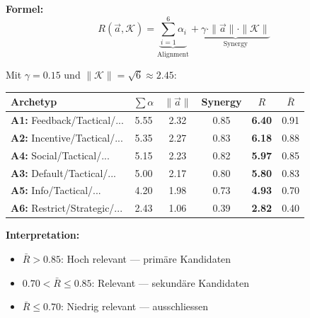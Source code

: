 \begin{tcolorbox}[colback=yellow!5!white, colframe=yellow!75!black,
    title=\textbf{Schritt 3: Relevanz $R(\vec{a}, \mathcal{K})$ berechnen}]

\textbf{Formel:}
\begin{equation*}
R(\vec{a}, \mathcal{K}) = \underbrace{\sum_{i=1}^{6} \alpha_i}_{\text{Alignment}} + \underbrace{\gamma \cdot \|\vec{a}\| \cdot \|\mathcal{K}\|}_{\text{Synergy}}
\end{equation*}

Mit $\gamma = 0.15$ und $\|\mathcal{K}\| = \sqrt{6} \approx 2.45$:

\medskip
\renewcommand{\arraystretch}{1.3}
\begin{tabular}{@{}lccccc@{}}
\toprule
\textbf{Archetyp} & $\sum\alpha$ & $\|\vec{a}\|$ & Synergy & $R$ & $\bar{R}$ \\
\midrule
\textbf{A1:} Feedback/Tactical/... & 5.55 & 2.32 & 0.85 & \cellcolor{green!20}\textbf{6.40} & \cellcolor{green!20}0.91 \\
\textbf{A2:} Incentive/Tactical/... & 5.35 & 2.27 & 0.83 & \cellcolor{green!20}\textbf{6.18} & \cellcolor{green!20}0.88 \\
\textbf{A4:} Social/Tactical/... & 5.15 & 2.23 & 0.82 & \cellcolor{green!20}\textbf{5.97} & \cellcolor{green!20}0.85 \\
\textbf{A3:} Default/Tactical/... & 5.00 & 2.17 & 0.80 & \cellcolor{yellow!20}\textbf{5.80} & \cellcolor{yellow!20}0.83 \\
\textbf{A5:} Info/Tactical/... & 4.20 & 1.98 & 0.73 & \cellcolor{yellow!20}\textbf{4.93} & \cellcolor{yellow!20}0.70 \\
\textbf{A6:} Restrict/Strategic/... & 2.43 & 1.06 & 0.39 & \cellcolor{red!20}\textbf{2.82} & \cellcolor{red!20}0.40 \\
\bottomrule
\end{tabular}

\medskip
\textbf{Interpretation:}
\begin{itemize}[nosep]
    \item \colorbox{green!20}{$\bar{R} > 0.85$}: Hoch relevant --- primäre Kandidaten
    \item \colorbox{yellow!20}{$0.70 < \bar{R} \leq 0.85$}: Relevant --- sekundäre Kandidaten
    \item \colorbox{red!20}{$\bar{R} \leq 0.70$}: Niedrig relevant --- ausschliessen
\end{itemize}

\end{tcolorbox}

